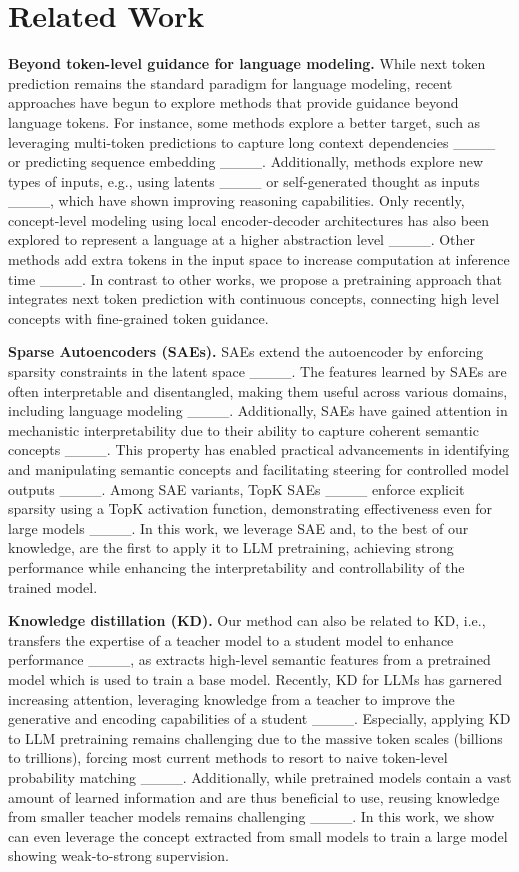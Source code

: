 \section{Related Work}
\label{sec:related}

\textbf{Beyond token-level guidance for language modeling.} While next token prediction remains the standard paradigm for language modeling, recent approaches have begun to explore methods that provide guidance beyond language tokens. For instance, some methods explore a better target, such as leveraging multi-token predictions to capture long context dependencies ____ or predicting sequence embedding ____. Additionally, methods explore new types of inputs, e.g., using latents ____ or self-generated thought as inputs ____, which have shown improving reasoning capabilities. Only recently, concept-level modeling using local encoder-decoder architectures has also been explored to represent a language at a higher abstraction level ____. Other methods add extra tokens in the input space to increase computation at inference time ____. In contrast to other works, we propose a pretraining approach that integrates next token prediction with continuous concepts, connecting high level concepts with fine-grained token guidance. 


\textbf{Sparse Autoencoders (SAEs).} SAEs extend the autoencoder by enforcing sparsity constraints in the latent space ____. The features learned by SAEs are often interpretable and disentangled, making them useful across various domains, including language modeling ____. Additionally, SAEs have gained attention in mechanistic interpretability due to their ability to capture coherent semantic concepts ____. This property has enabled practical advancements in identifying and manipulating semantic concepts and facilitating steering for controlled model outputs ____. Among SAE variants, TopK SAEs ____ enforce explicit sparsity using a TopK activation function, demonstrating effectiveness even for large models ____. In this work, we leverage SAE and, to the best of our knowledge, are the first to apply it to LLM pretraining, achieving strong performance while enhancing the interpretability and controllability of the trained model.

\textbf{Knowledge distillation (KD).} 
Our method can also be related to KD, i.e., transfers the expertise of a teacher model to a student model to enhance performance ____, as \sname extracts high-level semantic features from a pretrained model which is used to train a base model. Recently, KD for LLMs has garnered increasing attention, leveraging knowledge from a teacher to improve the generative and encoding capabilities of a student ____. Especially, applying KD to LLM pretraining remains challenging due to the massive token scales (billions to trillions), forcing most current methods to resort to naive token-level probability matching  ____. Additionally, while pretrained models contain a vast amount of learned information and are thus beneficial to use, reusing knowledge from smaller teacher models remains challenging ____. In this work, we show \sname can even leverage the concept extracted from small models to train a large model showing weak-to-strong supervision.